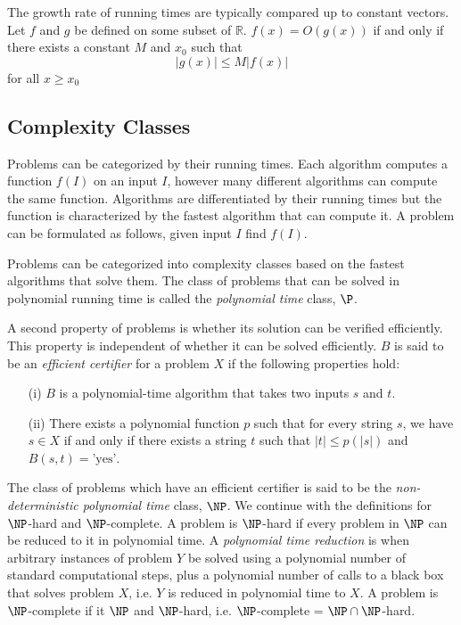 \documentclass[10pt]{CSUNthesis}
\theoremstyle{plain}%
\theoremstyle{definition}
\theoremstyle{remark}
\newcommand{\bbR}{{\mathbb{R}}}
\begin{document}
The growth rate of running times are typically compared up to constant vectors.
Let $f$ and $g$ be defined on some subset of $\bbR$.  
$f(x) = O\left(g(x)\right)$ if and only if there exists a constant $M$ and $x_0$ such that $$\left\vert g(x)\right\vert \leq M \left\vert f(x) \right\vert$$
for all $x \geq x_0$

\subsection{Complexity Classes}
Problems can be categorized by their running times.
Each algorithm computes a function $f(I)$ on an input $I$, however many different algorithms can compute the same function.
Algorithms are differentiated by their running times but the function is characterized by the fastest algorithm that can compute it.
A problem can be formulated as follows, given input $I$ find $f(I)$.

Problems can be categorized into complexity classes based on the fastest algorithms that solve them.
The class of problems that can be solved in polynomial running time is called the \textit{polynomial time} class, $\P$.

A second property of problems is whether its solution can be verified efficiently.  
This property is independent of whether it can be solved efficiently.  
$B$ is said to be an \textit{efficient certifier} for a problem $X$  if the following properties hold:
\begin{itemize}
\item[(i)] $B$ is a polynomial-time algorithm that takes two inputs $s$ and $t$.
\item[(ii)] There exists a polynomial function $p$ such that for every string $s$, we have $s \in X$ if and only if there exists a string $t$ such that $\vert t \vert \leq p\left( \vert s \vert \right)$ and $B(s,t) = \text{'yes'}$.
\end{itemize}

The class of problems which have an efficient certifier is said to be the \textit{non-deterministic polynomial time} class, $\NP$. 
We continue with the definitions for $\NP$-hard and $\NP$-complete.
A problem is $\NP$-hard if every problem in $\NP$ can be reduced to it in polynomial time.
A \textit{polynomial time reduction} is when arbitrary instances of problem $Y$ be solved using a polynomial number of standard computational steps, plus a polynomial number of calls to a black box that solves problem $X$, i.e. $Y$ is reduced in polynomial time to $X$.
A problem is $\NP$-complete if it $\NP$ and $\NP$-hard, i.e. $\NP$-complete = $\NP \cap \NP$-hard.
\end{document}
